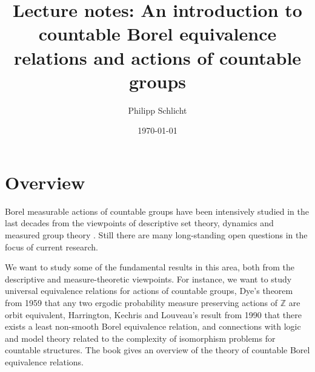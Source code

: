 \documentclass[10pt]{amsart}
\newcommand{\ZZ}{\mathbb{Z}}
\theoremstyle{definition}
\theoremstyle{remark}
\begin{document}




\author{Philipp Schlicht}
\address{Philipp Schlicht, School of Mathematics, University of Bristol, Fry Building, Woodland Road, Bristol, BS8 1UG, UK}
\urladdr{}

\date{\today}


\title[Lecture notes: Countable Borel equivalence relations]{Lecture notes: An introduction to countable Borel equivalence relations and actions of countable groups}


\maketitle


\setcounter{tocdepth}{2}








\section{Overview} 

Borel measurable actions of countable groups have been intensively studied in the last decades from the viewpoints of descriptive set theory, dynamics and measured group theory \cite{MR2827853, MR2711968, MR3612001, MR3359054, MR2583950, KechrisShinko2019, Ioana2019}. 
Still there are many long-standing open questions in the focus of current research. 

We want to study some of the fundamental results in this area, both from the descriptive and measure-theoretic viewpoints. 
For instance, we want to study universal equivalence relations for actions of countable groups, Dye's theorem from 1959 that any two ergodic probability measure preserving actions of $\ZZ$ are orbit equivalent, Harrington, Kechris and Louveau's result from 1990 that there exists a least non-smooth Borel equivalence relation, and connections with logic and model theory related to the complexity of isomorphism problems for countable structures. 
The book \cite{Kechris2019} gives an overview of the theory of countable Borel equivalence relations. 
 
\end{document}
